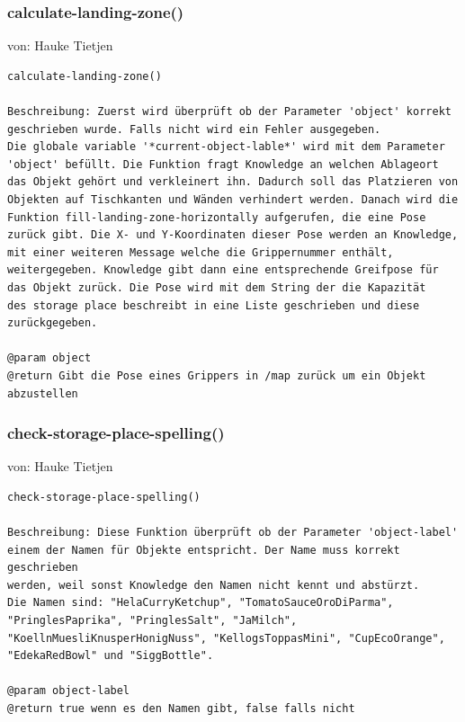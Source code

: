 \documentclass{suturo}
\makeatletter
\newcommand{\chapterauthor}[1]{%
  {\parindent0pt\vspace*{-27pt}%
  \linespread{0}\small\begin{flushright}von: #1\end{flushright}%
  \par\nobreak\vspace*{0pt}}
  \@afterheading%
}
\makeatother
\begin{document}
\subsubsection{calculate-landing-zone()}
\chapterauthor{Hauke Tietjen}
\begin{verbatim}
calculate-landing-zone()

Beschreibung: Zuerst wird überprüft ob der Parameter 'object' korrekt 
geschrieben wurde. Falls nicht wird ein Fehler ausgegeben. 
Die globale variable '*current-object-lable*' wird mit dem Parameter 
'object' befüllt. Die Funktion fragt Knowledge an welchen Ablageort 
das Objekt gehört und verkleinert ihn. Dadurch soll das Platzieren von 
Objekten auf Tischkanten und Wänden verhindert werden. Danach wird die 
Funktion fill-landing-zone-horizontally aufgerufen, die eine Pose 
zurück gibt. Die X- und Y-Koordinaten dieser Pose werden an Knowledge, 
mit einer weiteren Message welche die Grippernummer enthält,
weitergegeben. Knowledge gibt dann eine entsprechende Greifpose für 
das Objekt zurück. Die Pose wird mit dem String der die Kapazität 
des storage place beschreibt in eine Liste geschrieben und diese
zurückgegeben.

@param object
@return Gibt die Pose eines Grippers in /map zurück um ein Objekt abzustellen
\end{verbatim}

\begin{figure}[!htb]
\end{figure}

\subsubsection{check-storage-place-spelling()}
\chapterauthor{Hauke Tietjen}
\begin{verbatim}
check-storage-place-spelling()

Beschreibung: Diese Funktion überprüft ob der Parameter 'object-label'
einem der Namen für Objekte entspricht. Der Name muss korrekt geschrieben
werden, weil sonst Knowledge den Namen nicht kennt und abstürzt. 
Die Namen sind: "HelaCurryKetchup", "TomatoSauceOroDiParma", 
"PringlesPaprika", "PringlesSalt", "JaMilch", 
"KoellnMuesliKnusperHonigNuss", "KellogsToppasMini", "CupEcoOrange", 
"EdekaRedBowl" und "SiggBottle".

@param object-label
@return true wenn es den Namen gibt, false falls nicht
\end{verbatim}
\end{document}
